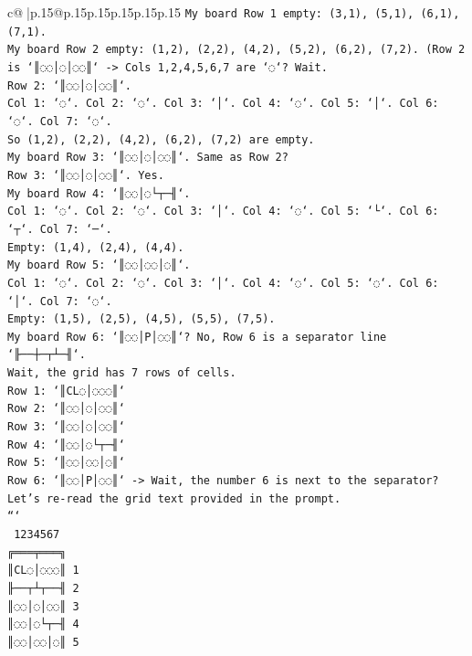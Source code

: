 \documentclass{article}
\begin{document}
{\begin{supertabular}{c@{$\;$}|p{.15\linewidth}@{}p{.15\linewidth}p{.15\linewidth}p{.15\linewidth}p{.15\linewidth}p{.15\linewidth}}
{{{\texttt{My board Row 1 empty: (3,1), (5,1), (6,1), (7,1).} \\
\texttt{My board Row 2 empty: (1,2), (2,2), (4,2), (5,2), (6,2), (7,2). (Row 2 is `║◌◌│◌│◌◌║` {-}> Cols 1,2,4,5,6,7 are `◌`? Wait.} \\
\texttt{Row 2: `║◌◌│◌│◌◌║`.} \\
\texttt{Col 1: `◌`. Col 2: `◌`. Col 3: `│`. Col 4: `◌`. Col 5: `│`. Col 6: `◌`. Col 7: `◌`.} \\
\texttt{So (1,2), (2,2), (4,2), (6,2), (7,2) are empty.} \\
\texttt{My board Row 3: `║◌◌│◌│◌◌║`. Same as Row 2?} \\
\texttt{Row 3: `║◌◌│◌│◌◌║`. Yes.} \\
\texttt{My board Row 4: `║◌◌│◌└┬─╢`.} \\
\texttt{Col 1: `◌`. Col 2: `◌`. Col 3: `│`. Col 4: `◌`. Col 5: `└`. Col 6: `┬`. Col 7: `─`.} \\
\texttt{Empty: (1,4), (2,4), (4,4).} \\
\texttt{My board Row 5: `║◌◌│◌◌│◌║`.} \\
\texttt{Col 1: `◌`. Col 2: `◌`. Col 3: `│`. Col 4: `◌`. Col 5: `◌`. Col 6: `│`. Col 7: `◌`.} \\
\texttt{Empty: (1,5), (2,5), (4,5), (5,5), (7,5).} \\
\texttt{My board Row 6: `║◌◌│P│◌◌║`? No, Row 6 is a separator line `╟──┼─┬┴─╢`.} \\
\texttt{Wait, the grid has 7 rows of cells.} \\
\texttt{Row 1: `║CL◌│◌◌◌║`} \\
\texttt{Row 2: `║◌◌│◌│◌◌║`} \\
\texttt{Row 3: `║◌◌│◌│◌◌║`} \\
\texttt{Row 4: `║◌◌│◌└┬─╢`} \\
\texttt{Row 5: `║◌◌│◌◌│◌║`} \\
\texttt{Row 6: `║◌◌│P│◌◌║` {-}> Wait, the number 6 is next to the separator?} \\
\texttt{Let's re{-}read the grid text provided in the prompt.} \\
\texttt{```} \\
\texttt{ 1234567} \\
\texttt{╔═══╤═══╗} \\
\texttt{║CL◌│◌◌◌║ 1} \\
\texttt{╟──┬┴┬──╢ 2} \\
\texttt{║◌◌│◌│◌◌║ 3} \\
\texttt{║◌◌│◌└┬─╢ 4} \\
\texttt{║◌◌│◌◌│◌║ 5} \\
}}}
\end{supertabular}}
\end{document}

